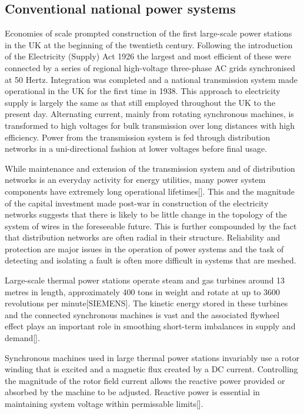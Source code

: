 \subsection{Conventional national power systems}
Economies of scale prompted construction of the first large-scale power
stations in the UK at the beginning of the twentieth century.  Following the
introduction of the Electricity (Supply) Act 1926 the largest and most
efficient of these were connected by a series of regional high-voltage
three-phase AC grids synchronised at 50 Hertz.  Integration was completed and
a national transmission system made operational in the UK for the first time
in 1938.  This approach to electricity supply is largely the same as that
still employed throughout the UK to the present day.  Alternating current,
mainly from rotating synchronous machines, is transformed to high voltages for
bulk transmission over long distances with high efficiency.  Power from the
transmission system is fed through distribution networks in a uni-directional
fashion at lower voltages before final usage.

While maintenance and extension of the transmission system and of distribution
networks is an everyday activity for energy utilities, many power system
components have extremely long operational lifetimes[].  This and the
magnitude of the capital investment made post-war in construction of the
electricity networks suggests that there is likely to be little change in the
topology of the system of wires in the foreseeable future.  This is further
compounded by the fact that distribution networks are often radial in their
structure.  Reliability and protection are major issues in the operation of
power systems and the task of detecting and isolating a fault is often more
difficult in systems that are meshed.

Large-scale thermal power stations operate steam and gas turbines around 13
metres in length, approximately 400 tons in weight and rotate at up to 3600
revolutions per minute[SIEMENS].  The kinetic energy stored in these turbines
and the connected synchronous machines is vast and the associated flywheel
effect plays an important role in smoothing short-term imbalances in supply
and demand[].

Synchronous machines used in large thermal power stations invariably use a
rotor winding that is excited and a magnetic flux created by a DC current.
Controlling the magnitude of the rotor field current allows the reactive power
provided or absorbed by the machine to be adjusted.  Reactive power is
essential in maintaining system voltage within permissable limits[].

